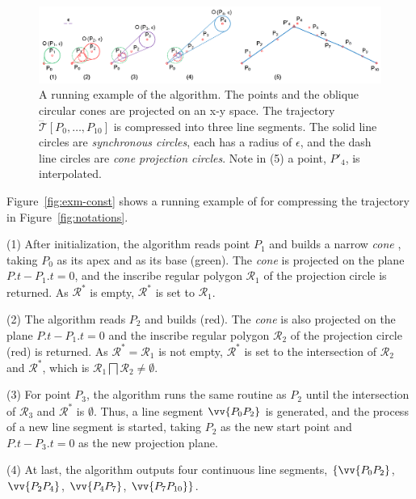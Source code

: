 \begin{figure}[tb!]
	\centering
	\includegraphics[scale=0.79]{figures/Fig-Conesta.png}
	\caption{\small A running example of the \cista algorithm. The points and the oblique circular cones are projected on an x-y space. The trajectory $\dddot{\mathcal{T}}[P_0, \ldots, P_{10}]$ is compressed into three line segments. The solid line circles are \emph{synchronous circles}, each has a radius of $\epsilon$, and the dash line circles are \emph{cone projection circles}. Note in (5) a point, $P'_4$, is interpolated.}
	\vspace{-2ex}
	\label{fig:exm-consta}
\end{figure}


\begin{example}
\label{exm-alg-conest}
Figure~\ref{fig:exm-const} shows a running example of \cist for compressing the trajectory  in Figure~\ref{fig:notations}.

\sstab (1) After initialization, the \cist algorithm reads point $P_1$ and builds a narrow \emph{cone} , taking $P_0$ as its apex and  as its base (green). The \emph{cone} is projected on the plane $P.t-P_1.t=0$, and the inscribe regular polygon $\mathcal{R}_1$ of the projection circle is returned. As $\mathcal{R}^*$ is empty, $\mathcal{R}^*$ is set to $\mathcal{R}_1$.

\sstab(2) The algorithm reads $P_2$ and builds  (red). The \emph{cone} is also projected on the plane $P.t-P_1.t=0$ and the inscribe regular polygon $\mathcal{R}_2$ of the projection circle (red) is returned. As $\mathcal{R}^*=\mathcal{R}_1$ is not empty, $\mathcal{R}^*$ is set to the intersection of $\mathcal{R}_2$ and $\mathcal{R}^*$, which is $\mathcal{R}_1 \bigsqcap \mathcal{R}_2 \ne \emptyset$.

\sstab (3) For point $P_3$, the algorithm runs the same routine as $P_2$ until the intersection of $\mathcal{R}_3$ and $\mathcal{R}^*$ is $\emptyset$. Thus, a line segment $\vv{P_0P_2}$ is generated, and the process of a new line segment is started, taking $P_2$ as the new start point and $P.t-P_3.t=0$ as the new projection plane.

\sstab (4) At last, the algorithm outputs four continuous line segments, \ie $\{\vv{P_0P_2}$, $\vv{P_2P_4}$, $\vv{P_4P_{7}}$, $\vv{P_7P_{10}}\}$. \eop
\end{example}





